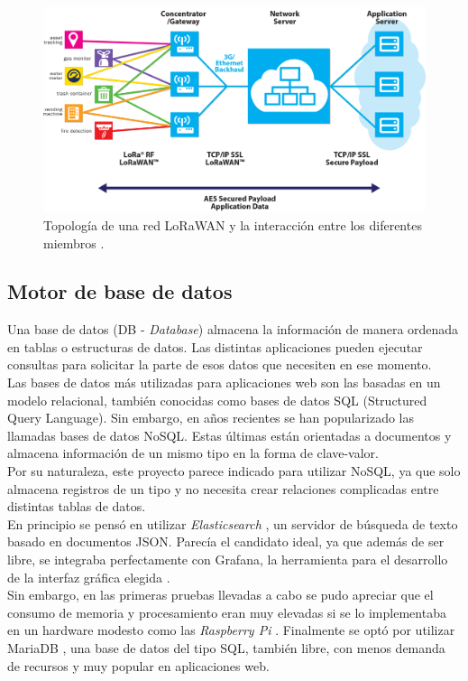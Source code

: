 \begin{figure}[h]
	\centering
	\includegraphics[width=0.9\linewidth]{Figures/sensor-gw-architecture-lora}
	\caption{Topología de una red LoRaWAN y la interacción entre los diferentes miembros \citep{lora_alliance}.}
	\label{fig:sensor-gw-architecture-lora}
\end{figure}

\subsection{Motor de base de datos}
Una base de datos (DB - \textit{Database}) almacena la información de manera ordenada en tablas o estructuras de datos. Las distintas aplicaciones pueden ejecutar consultas para solicitar la parte de esos datos que necesiten en ese momento.\\
Las bases de datos más utilizadas para aplicaciones web son las basadas en un modelo relacional, también conocidas como bases de datos SQL (Structured Query Language). Sin embargo, en años recientes se han popularizado las llamadas bases de datos NoSQL. Estas últimas están orientadas a documentos y almacena información de un mismo tipo en la forma de clave-valor.\\
Por su naturaleza, este proyecto parece indicado para utilizar NoSQL, ya que solo almacena registros de un tipo y no necesita crear relaciones complicadas entre distintas tablas de datos.\\
En principio se pensó en utilizar \textit{Elasticsearch} \citep{elasticsearch}, un servidor de búsqueda de texto basado en documentos JSON. Parecía el candidato ideal, ya que además de ser libre, se integraba perfectamente con Grafana, la herramienta para el desarrollo de la interfaz gráfica elegida \citep{grafana}.\\
Sin embargo, en las primeras pruebas llevadas a cabo se pudo apreciar que el consumo de memoria y procesamiento eran muy elevadas si se lo implementaba en un hardware modesto como las \textit{Raspberry Pi} \citep{raspi}. Finalmente se optó por utilizar MariaDB \citep{mariadb}, una base de datos del tipo SQL, también libre, con menos demanda de recursos y muy popular en aplicaciones web.\\

